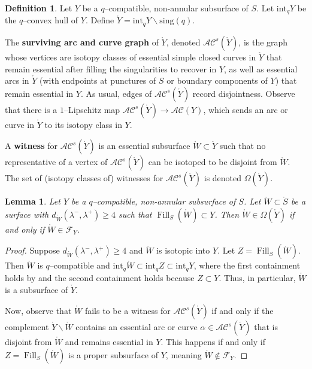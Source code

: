 \documentclass[11pt,letterpaper]{amsart}
\newcommand{\stnote}[1]{\todo[color=blue!30,linecolor=blue!80!black,size= \footnotesize]{#1}}
\newcommand{\sing}{\mathrm{sing}}
\newcommand{\Fill}{\operatorname{Fill}}
\newcommand{\mc}{\mathcal}
\newcommand{\mr}{\mathring}
\newcommand{\psub}{\mr W}
\numberwithin{equation}{section}
\newtheorem{lemma}[theorem]{Lemma}
\theoremstyle{definition}
\newtheorem{definition}[theorem]{Definition}
\newtheorem{remark}[theorem]{Remark}
\newcommand{\define}[1]{\textbf{#1}}
\renewcommand{\setminus}{\smallsetminus}
\newcommand{\AC}{\mathcal{AC}}
\renewcommand{\int}{\mathrm{int}}
\begin{document}
\begin{definition}
Let $Y$ be a $q$--compatible, non-annular subsurface of $S$. Let $\int_q Y$ be the $q$--convex hull of $Y$. Define $\mr Y = \int_q Y \setminus \sing(q)$. 


The \define{surviving arc and curve graph} of $\mr Y$, denoted $\AC^s(\mr Y)$, is the graph whose vertices are isotopy classes of essential simple closed curves in $\mr Y$ that remain essential after filling the singularities to recover  in $Y$, as well as essential arcs in $\mr Y$ (with endpoints at punctures of $S$ or boundary components of $Y$) that remain essential in $Y$. As usual, edges of $\AC^s(\mr Y)$ record disjointness. Observe that there is a $1$--Lipschitz map $\AC^s(\mr Y) \to \AC(Y)$, which sends an arc or  curve in $\mr Y$ to its isotopy class in $Y$. 


A \define{witness} for $\AC^s(\mr Y)$ is an essential subsurface $\psub \subset \mr Y$ such that no  representative of a vertex of $\AC^s(\mr Y)$ can be isotoped to be disjoint from $\psub$. The set of (isotopy classes of) witnesses for $\AC^s(\mr Y)$ is denoted $\Omega(\mr Y)$.
\end{definition}

\begin{lemma}\label{Lem:Witness}
Let $Y$ be a $q$--compatible, non-annular subsurface of $S$. 
Let $\psub \subset \mr S$ be a surface with $d_{\psub}(\lambda^{-}, \lambda^{+}) \geq 4$ such that
$\Fill_S(\psub) \subset Y$.
Then $\psub\in \Omega(\mr Y)$ if and only if $\psub \in \mc F_Y$. 
\end{lemma}

\begin{proof}
Suppose $d_{\psub}(\lambda^{-}, \lambda^{+}) \geq 4$ and $\psub$ is isotopic into $Y$. Let $Z = \Fill_S(\psub)$. Then $\psub$ is $q$--compatible and $\int_q \psub \subset \int_q Z \subset \int_q Y$, where the first containment holds by  and the second containment holds because $Z \subset Y$. Thus, in particular, $\psub$ is a subsurface of $\mr Y$.

Now, observe that $\psub$ fails to be a witness 
 for $\AC^s(\mr Y)$ if and only if the complement $\mr Y \setminus \psub$ contains an essential arc or curve $\alpha \in \AC^s(\mr Y)$ that is disjoint from $\psub$ and remains essential in $Y$. This happens if and only if $Z = \Fill_S(\psub)$ is a proper subsurface of $Y$, meaning $\psub \notin \mc F_Y$.
\end{proof}
\end{document}
